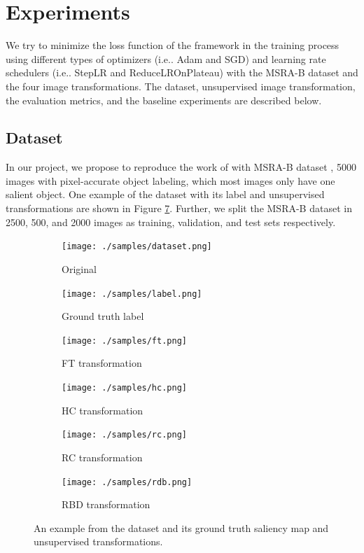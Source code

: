 \documentclass{article}
\makeatletter
\DeclareRobustCommand\onedot{\futurelet\@let@token\@onedot}
\def\@onedot{\ifx\@let@token.\else.\null\fi\xspace}
\def\ie{i.e\onedot} \def\Ie{I.e\onedot}
\makeatother
\begin{document}
\section{Experiments}

We try to minimize the loss function of the framework in the training process using different types of optimizers (\ie Adam and SGD) and learning rate schedulers (\ie StepLR and ReduceLROnPlateau) with the MSRA-B dataset and the four image transformations. The dataset, unsupervised image transformation, the evaluation metrics, and the baseline experiments are described below.

\subsection{Dataset}

In our project, we propose to reproduce the work of \cite{zhang2018} with MSRA-B dataset \cite{wang2017}, 5000 images with pixel-accurate object labeling, which most images only have one salient object. One example of the dataset with its label and unsupervised transformations are shown in Figure \ref{fig:samples}. Further, we split the MSRA-B dataset in 2500, 500, and 2000 images as training, validation, and test sets respectively.

\begin{figure}[h]
  \begin{subfigure}{.33\textwidth}
    \centering
    \texttt{[image: ./samples/dataset.png]}
    \caption{Original}
    \label{fig:sample}
  \end{subfigure}
  \begin{subfigure}{.33\textwidth}
    \centering
    \texttt{[image: ./samples/label.png]}
    \caption{Ground truth label}
    \label{fig:label}
  \end{subfigure}
  \begin{subfigure}{.33\textwidth}
    \centering
    \texttt{[image: ./samples/ft.png]}
    \caption{FT transformation}
    \label{fig:ft}
  \end{subfigure}
  \begin{subfigure}{.33\textwidth}
    \centering
    \texttt{[image: ./samples/hc.png]}
    \caption{HC transformation}
    \label{fig:hc}
  \end{subfigure}
  \begin{subfigure}{.33\textwidth}
    \centering
    \texttt{[image: ./samples/rc.png]}
    \caption{RC transformation}
    \label{fig:rc}
  \end{subfigure}
  \begin{subfigure}{.33\textwidth}
    \centering
    \texttt{[image: ./samples/rdb.png]}
    \caption{RBD transformation}
    \label{fig:rbd}
  \end{subfigure}
  \caption{An example from the dataset and its ground truth saliency map and unsupervised transformations.}
  \label{fig:samples}
\end{figure}
\end{document}
